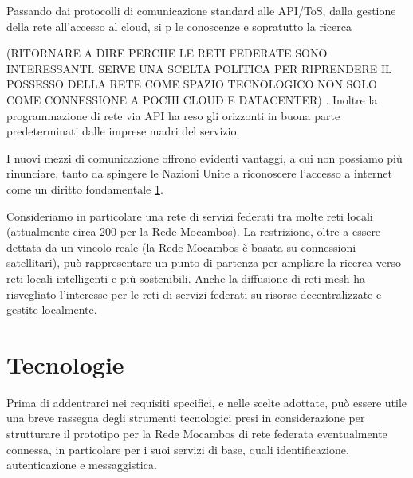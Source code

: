 Passando dai protocolli di comunicazione standard alle API/ToS, dalla
gestione della rete all'accesso al cloud, si p le conoscenze e
sopratutto la ricerca

(RITORNARE A DIRE PERCHE LE RETI FEDERATE SONO INTERESSANTI. SERVE UNA
SCELTA POLITICA PER RIPRENDERE IL POSSESSO DELLA RETE COME SPAZIO
TECNOLOGICO NON SOLO COME CONNESSIONE A POCHI CLOUD E DATACENTER)
. Inoltre la programmazione di rete via API ha reso gli orizzonti in
buona parte predeterminati dalle imprese madri del servizio.

I nuovi mezzi di comunicazione offrono evidenti vantaggi, a cui non
possiamo più rinunciare, tanto da spingere le Nazioni Unite a
riconoscere l'accesso a internet come un diritto fondamentale \ref{}.

Consideriamo in particolare una rete di servizi federati tra molte
reti locali (attualmente circa 200 per la Rede Mocambos). La
restrizione, oltre a essere dettata da un vincolo reale (la Rede
Mocambos è basata su connessioni satellitari), può rappresentare un
punto di partenza per ampliare la ricerca verso reti locali
intelligenti e più sostenibili. Anche la diffusione di reti mesh ha
risvegliato l'interesse per le reti di servizi federati su risorse
decentralizzate e gestite localmente.


\section{Tecnologie}

Prima di addentrarci nei requisiti specifici, e nelle scelte adottate,
può essere utile una breve rassegna degli strumenti tecnologici presi
in considerazione per strutturare il prototipo per la Rede Mocambos di
rete federata eventualmente connessa, in particolare per i suoi
servizi di base, quali identificazione, autenticazione e
messaggistica.


